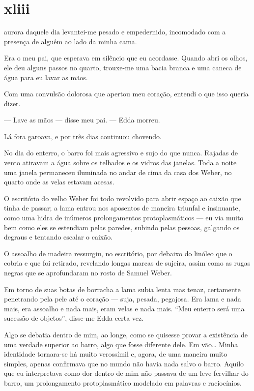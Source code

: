 \section{xliii} 

 aurora daquele dia levantei-me pesado e empedernido, incomodado
 com a presença de alguém ao lado da minha cama.

Era o meu pai, que esperava em silêncio que eu acordasse. Quando abri os
olhos, ele deu alguns passos no quarto, trouxe-me uma bacia branca e uma
caneca de água para eu lavar as mãos.

Com uma convulsão dolorosa que apertou meu coração, entendi o que isso queria
dizer.

--- Lave as mãos --- disse meu pai. --- Edda morreu.

Lá fora garoava, e por três dias continuou chovendo.

No dia do enterro, o barro foi mais agressivo e sujo do que nunca. Rajadas de
vento atiravam a água sobre os telhados e os vidros das janelas. Toda a noite
uma janela permaneceu iluminada no andar de cima da casa dos Weber, no quarto
onde as velas estavam acesas.

O escritório do velho Weber foi todo revolvido para abrir espaço ao caixão que
tinha de passar; a lama entrou nos aposentos de maneira triunfal e
insinuante, como uma hidra de inúmeros prolongamentos protoplasmáticos --- eu
via muito bem como eles se estendiam pelas paredes, subindo pelas pessoas,
galgando os degraus e tentando escalar o caixão.

O assoalho de madeira ressurgiu, no escritório, por debaixo do linóleo que o
cobria e que foi retirado, revelando longas marcas de sujeira, assim como as
rugas negras que se aprofundaram no rosto de Samuel Weber.

Em torno de suas botas de borracha a lama subia lenta mas tenaz, certamente
penetrando pela pele até o coração --- suja, pesada, pegajosa. Era lama e
nada mais, era assoalho e nada mais, eram velas e nada mais. ``Meu enterro
será uma sucessão de objetos'', disse-me Edda certa vez.

Algo se debatia dentro de mim, ao longe, como se quisesse provar a existência
de uma verdade superior ao barro, algo que fosse diferente dele. Em vão\ldots
{} Minha identidade tornara-se há muito verossímil e, agora, de uma maneira
muito simples, apenas confirmava que no mundo não havia nada salvo o barro.
Aquilo que eu interpretava como dor dentro de mim não passava de um leve
fervilhar do barro, um prolongamento protoplasmático modelado em palavras e
raciocínios.


